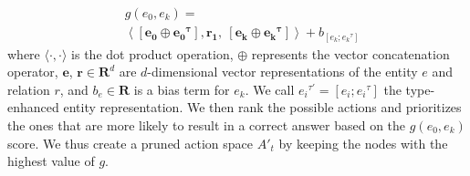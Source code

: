 \begin{equation}\label{eq:one-hop-score}
\begin{aligned}
& g(e_0,e_k) = \\ 
& \left\langle\mathbf{[e_0\oplus{e_0}^{\tau}]},\mathbf{r_1},~\mathbf{[e_k\oplus{e_k}^{\tau}]}\right\rangle + b_{[e_k;{e_k}^{\tau}]}
\end{aligned}
\end{equation}
where $\langle\cdot,\cdot\rangle$ is the dot product operation, $\oplus$ represents the vector concatenation operator, $\mathbf{e}$, $\mathbf{r}\in\mathbf{R}^d$ are $d$-dimensional vector representations of the entity $e$ and relation $r$, and $b_{e}\in\mathbf{R}$ is a bias term for $e_k$. We call ${e_i}^{\tau'}=[e_i;{e_i}^{\tau}]$ the type-enhanced entity representation. We then rank the possible actions and prioritizes the ones that are more likely to result in a correct answer based on the $g(e_0,e_k)$ score. We thus create a pruned action space $A'_t$ by keeping the nodes with the highest value of $g$.

